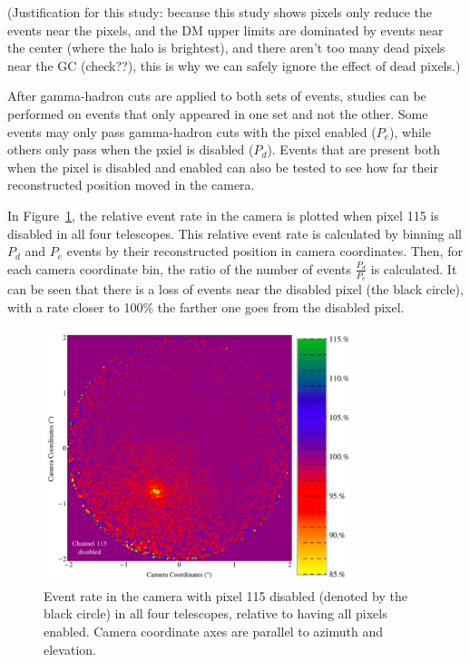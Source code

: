     {\color{red}(Justification for this study: because this study shows pixels only reduce the events near the pixels, and the DM upper limits are dominated by events near the center (where the halo is brightest), and there aren't too many dead pixels near the GC (check??), this is why we can safely ignore the effect of dead pixels.)}
    
    After gamma-hadron cuts are applied to both sets of events, studies can be performed on events that only appeared in one set and not the other.
    Some events may only pass gamma-hadron cuts with the pixel enabled ($P_e$), while others only pass when the pxiel is disabled ($P_d$).
    Events that are present both when the pixel is disabled and enabled can also be tested to see how far their reconstructed position moved in the camera.

    In Figure~\ref{fig:dpix_rel_camera}, the relative event rate in the camera is plotted when pixel 115 is disabled in all four telescopes.
    This relative event rate is calculated by binning all $P_d$ and $P_e$ events by their reconstructed position in camera coordinates.
    Then, for each camera coordinate bin, the ratio of the number of events $\frac{P_d}{P_e}$ is calculated.
    It can be seen that there is a loss of events near the disabled pixel (the black circle), with a rate closer to 100\% the farther one goes from the disabled pixel.

    \begin{figure}[ht]
      \centering
      \includegraphics[width=0.8\textwidth]{images/disabled_pixel/relativerate_camera}
      \caption[Relative Event Rate After Disabling Camera Pixels]{
        Event rate in the camera with pixel 115 disabled (denoted by the black circle) in all four telescopes, relative to having all pixels enabled.
        Camera coordinate axes are parallel to azimuth and elevation.
      }
      \label{fig:dpix_rel_camera}
    \end{figure}
    
